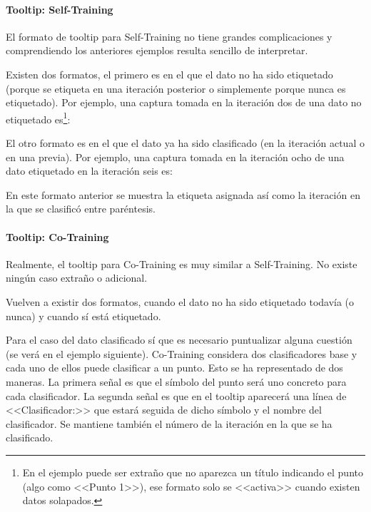 \paragraph{Tooltip: Self-Training}

El formato de tooltip para Self-Training no tiene grandes complicaciones y
comprendiendo los anteriores ejemplos resulta sencillo de interpretar.

Existen dos formatos, el primero es en el que el dato no ha sido etiquetado
(porque se etiqueta en una iteración posterior o simplemente porque nunca es
etiquetado). Por ejemplo, una captura tomada en la iteración dos de una dato no
etiquetado es\footnote{En el ejemplo puede ser extraño que no aparezca un título
indicando el punto (algo como <<Punto 1>>), ese formato solo se <<activa>>
cuando existen datos solapados.}:


El otro formato es en el que el dato ya ha sido clasificado (en la iteración
actual o en una previa). Por ejemplo, una captura tomada en la iteración ocho de
una dato etiquetado en la iteración seis es:


En este formato anterior se muestra la etiqueta asignada así como la iteración
en la que se clasificó entre paréntesis.

\paragraph{Tooltip: Co-Training}

Realmente, el tooltip para Co-Training es muy similar a Self-Training. No existe
ningún caso extraño o adicional.

Vuelven a existir dos formatos, cuando el dato no ha sido etiquetado todavía (o
nunca) y cuando sí está etiquetado. 


Para el caso del dato clasificado sí que es necesario puntualizar alguna
cuestión (se verá en el ejemplo siguiente). Co-Training considera dos
clasificadores base y cada uno de ellos puede clasificar a un punto. Esto se ha
representado de dos maneras. La primera señal es que el símbolo del punto será
uno concreto para cada clasificador. La segunda señal es que en el tooltip
aparecerá una línea de <<Clasificador:>> que estará seguida de dicho símbolo y
el nombre del clasificador. Se mantiene también el número de la iteración en la
que se ha clasificado.


